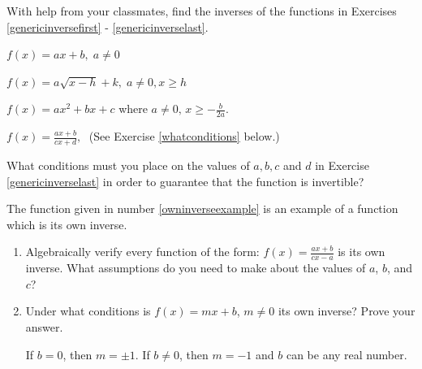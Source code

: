 \documentclass{ximera}
\begin{document}
\begin{question}
With help from your classmates, find the inverses of the functions in Exercises \ref{genericinversefirst} - \ref{genericinverselast}.

\begin{problem}\label{genericinversefirst}
$f(x) = ax + b, \; a \neq 0$
\end{problem}

\begin{problem}
$f(x) = a\sqrt{x - h} + k, \; a \neq 0, x \geq h$
\end{problem}

\begin{problem}
$f(x) = ax^{2} + bx + c$ where $a \neq 0, \, x \geq -\frac{b}{2a}$.
\end{problem}

\begin{problem}\label{genericinverselast}
$f(x) = \frac{ax + b}{cx + d},\;$ (See Exercise \ref{whatconditions} below.) 

\end{problem}
\end{question}

\begin{problem}
What conditions must you place on the values of $a, b, c$ and $d$ in Exercise \ref{genericinverselast} in order to guarantee that the function is invertible?
\end{problem}


\begin{problem}
The function given in number \ref{owninverseexample} is an example of a function which is its own inverse.  

\begin{enumerate}
\item 
Algebraically verify every function of the form: $f(x) = \frac{ax + b}{cx - a}$ is its own inverse.  What assumptions do you need to make about the values of  $a$, $b$, and $c$?

\item 
Under what conditions is $f(x) = mx + b$, $m \neq 0$ its own inverse?  Prove your answer.

\begin{solution}
If $b =0$, then $m = \pm 1$.  If $b \neq 0$, then $m = -1$ and $b$ can be any real number.
\end{solution}
\end{enumerate}
\end{problem}
\end{document}
